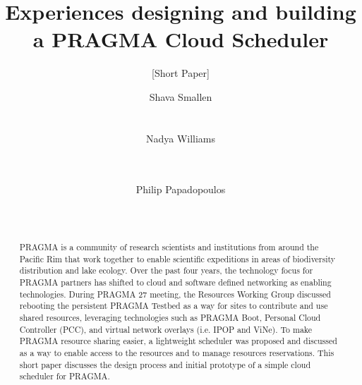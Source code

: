 \documentclass{acm_proc_article-sp}
\begin{document}
\sloppy %
\title{Experiences designing and building a PRAGMA Cloud Scheduler}
\subtitle{[Short Paper]}


\author{
\alignauthor
Shava Smallen\\
      \\
      \\
\alignauthor
Nadya Williams\\
      \\
      \\
\and %
\alignauthor Philip Papadopoulos \\
      \\
      \\
}

\maketitle
\begin{abstract}
PRAGMA is a community of research scientists and institutions from around the Pacific Rim that work together to enable scientific expeditions in areas of biodiversity distribution and lake ecology.  Over the past four years, the technology focus for PRAGMA partners has shifted to cloud and software defined networking as enabling technologies.  During PRAGMA 27 meeting, the Resources Working Group discussed rebooting the persistent PRAGMA Testbed as a way for sites to contribute and use shared resources, leveraging technologies such as PRAGMA Boot, Personal Cloud Controller (PCC), and virtual network overlays (i.e. IPOP and ViNe).  To make PRAGMA resource sharing easier, a lightweight scheduler was proposed and discussed as a way to enable access to the resources and to manage resources reservations.  This short paper discusses the design process and initial prototype of a simple cloud scheduler for PRAGMA.  

\end{abstract}

\end{document}
